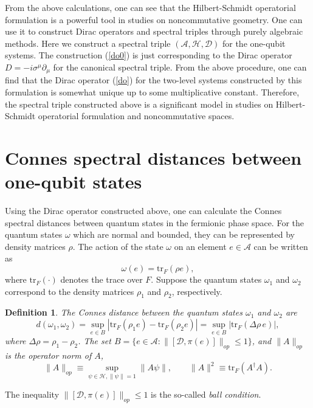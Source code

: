 \documentclass[a4paper,12pt]{article}
\newtheorem{definition}{Definition}
\begin{document}
From the above calculations, one can see that the Hilbert-Schmidt operatorial formulation is a powerful tool in studies on noncommutative geometry. One can use it to construct Dirac operators and spectral triples
through purely algebraic methods.
Here we construct a spectral triple $(\mathcal{A},\mathcal{H},\mathcal{D})$ for the one-qubit systems.
The construction (\ref{do0}) is just corresponding to the Dirac operator $D=-i\sigma^{\mu} \partial_{\mu}$ for the canonical spectral triple.
From the above procedure, one can find that the Dirac operator (\ref{do}) for the two-level systems constructed by this formulation
is somewhat unique up to some multiplicative constant. Therefore, the spectral triple constructed above is a significant model in studies on Hilbert-Schmidt operatorial formulation and noncommutative spaces.


\section{Connes spectral distances between one-qubit states}\label{sec3}
Using the Dirac operator constructed above, one can calculate the Connes spectral distances between quantum states in the fermionic phase space.
For the quantum states $\omega$ which are normal and bounded, they can be represented by density matrices $\rho$.
The action of the state $\omega$ on an element $e\in \mathcal{A}$ can be written as
\begin{equation}
	\omega(e)=\mathrm{tr}_{F}(\rho e),
\end{equation}
where $\mathrm{tr}_{F}(\cdot)$ denotes the trace over $F$.
Suppose the quantum states $\omega_1$ and $\omega_2$ correspond to the density matrices $\rho_1$ and $\rho_2$, respectively.
\begin{definition}\cite{Connes1}
	The Connes distance between the quantum states $\omega_1$ and $\omega_2$ are 
	\begin{equation}
		d(\omega_1,\omega_2)=\sup_{e\in B}|\mathrm{tr}_{F}(\rho_1 e)-\mathrm{tr}_{F}(\rho_2 e)|
		=\sup_{e\in B}|\mathrm{tr}_{F}(\Delta\rho\, e)|,
	\end{equation}
	where $\Delta\rho=\rho_1-\rho_2$.
	The set $B=\{e\in \mathcal{A}: \|[\mathcal{D},\pi(e)]\|_{op}\leqslant 1\}$,
	and $\|A\|_{op}$ is the operator norm of $A$,
	\begin{equation}
		\|A\|_{op}\equiv\sup_{\psi\in \mathcal{H},\|\psi\|=1}\|A\psi\|,\qquad
		\|A\|^2\equiv \mathrm{tr}_{F}(A^{\dag}A).
	\end{equation}
\end{definition}
The inequality $\|[\mathcal{D},\pi(e)]\|_{op}\leqslant 1$ is the so-called \emph{ball condition}.
\end{document}
